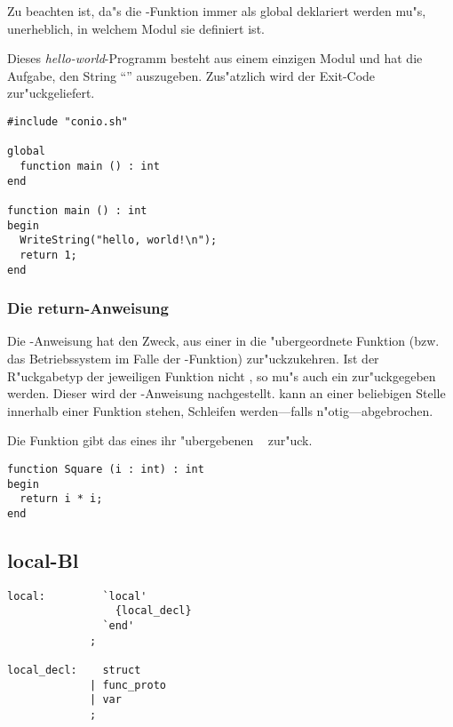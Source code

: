 Zu beachten ist, da"s die -Funktion immer als global
deklariert werden mu"s, unerheblich, in welchem Modul sie
definiert ist.

\example
Dieses {\em hello-world}-Programm
besteht aus einem
einzigen Modul und hat die Aufgabe, den String "`"'
auszugeben. Zus"atzlich wird der Exit-Code  zur"uckgeliefert.

\begin{verbatim}
#include "conio.sh"

global
  function main () : int
end

function main () : int
begin
  WriteString("hello, world!\n");
  return 1;
end
\end{verbatim}

\subsubsection{Die return-Anweisung}
Die -Anweisung hat den Zweck, aus einer  in
die "ubergeordnete Funktion (bzw. das Betriebssystem im Falle der
-Funktion) zur"uckzukehren. Ist der R"uckgabetyp der
jeweiligen Funktion nicht \tvoid ,
so mu"s auch ein 
zur"uckgegeben werden. Dieser wird der -Anweisung
nachgestellt.  kann an einer beliebigen Stelle
innerhalb einer Funktion stehen, Schleifen
 werden---falls n"otig---abgebrochen.

\example
Die Funktion  gibt
das  eines ihr "ubergebenen \tint\  zur"uck.

\begin{verbatim}
function Square (i : int) : int
begin
  return i * i;
end
\end{verbatim}

\subsection{local-Bl}

\begin{verbatim}
local:         `local'
                 {local_decl}
               `end'
             ;

local_decl:    struct
             | func_proto
             | var
             ;
\end{verbatim}

